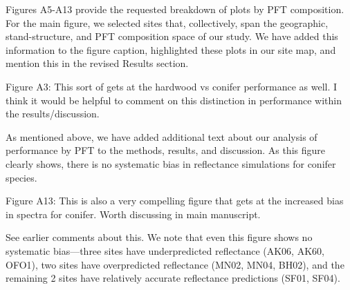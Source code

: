 Figures A5-A13 provide the requested breakdown of plots by PFT composition.
For the main figure, we selected sites that, collectively, span the geographic, stand-structure, and PFT composition space of our study.
We have added this information to the figure caption, highlighted these plots in our site map, and mention this in the revised Results section.

\begin{reviewer}
  Figure A3: This sort of gets at the hardwood vs conifer performance as well. I think it would be helpful to comment on this distinction in performance within the results/discussion.
\end{reviewer}

As mentioned above, we have added additional text about our analysis of performance by PFT to the methods, results, and discussion.
As this figure clearly shows, there is no systematic bias in reflectance simulations for conifer species.

\begin{reviewer}
  Figure A13: This is also a very compelling figure that gets at the increased bias in spectra for conifer. Worth discussing in main manuscript.
\end{reviewer}

See earlier comments about this.
We note that even this figure shows no systematic bias---three sites have underpredicted reflectance (AK06, AK60, OFO1), two sites have overpredicted reflectance (MN02, MN04, BH02), and the remaining 2 sites have relatively accurate reflectance predictions (SF01, SF04).
